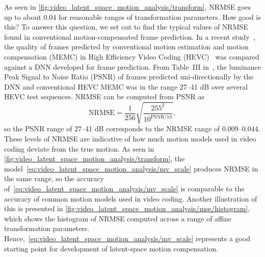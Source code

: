 









As seen in \cref{fig:video_latent_space_motion_analysis/transform}, NRMSE goes up to about 0.04 for reasonable ranges of transformation parameters. How good is this? To answer this question, we set out to find the typical values of NRMSE found in conventional motion-compensated frame prediction.
In a recent study~\cite{Choi_TCSVT_2020}, the quality of frames predicted by conventional motion estimation and motion compensation (MEMC) in High Efficiency Video Coding (HEVC)~\cite{H.265} was compared against a DNN developed for frame prediction. From Table~III in~\cite{Choi_TCSVT_2020}, the luminance Peak Signal to Noise Ratio (PSNR) of frames predicted uni-directionally by the DNN and conventional HEVC MEMC was in the range 27--41 dB over several HEVC test sequences. NRMSE can be computed from PSNR as
\begin{equation}
    \text{NRMSE} = \frac{1}{256}\sqrt{\frac{255^2}{10^{\text{PSNR}/10}}},
\end{equation}
so the PSNR range of 27--41 dB corresponds to the NRMSE range of 0.009--0.044. These levels of NRMSE are indicative of how much motion models used in video coding deviate from the true motion. As seen in \cref{fig:video_latent_space_motion_analysis/transform}, the model~\cref{eq:video_latent_space_motion_analysis/mv_scale} produces NRMSE in the same range, so the accuracy of~\cref{eq:video_latent_space_motion_analysis/mv_scale} is comparable to the accuracy of common motion models used in video coding. Another illustration of this is presented in \cref{fig:video_latent_space_motion_analysis/mse/histogram}, which shows the histogram of NRMSE computed across a range of affine transformation parameters.  Hence,~\cref{eq:video_latent_space_motion_analysis/mv_scale} represents a good starting point for development of latent-space motion compensation.

